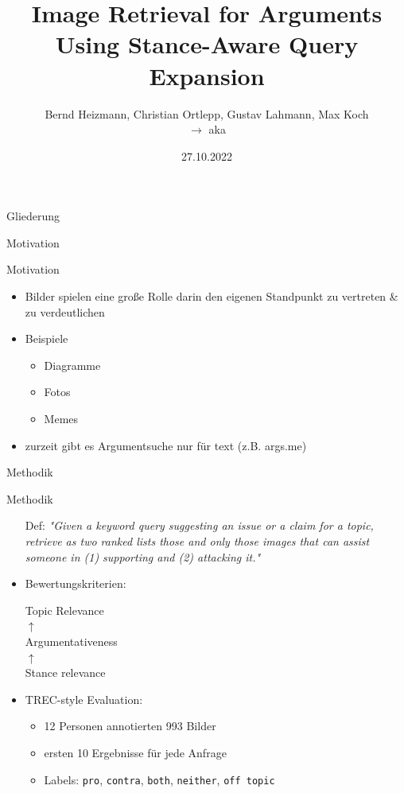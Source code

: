 \documentclass[usenames,dvipsnames]{beamer}
\title{Image Retrieval for Arguments Using Stance-Aware Query Expansion \texorpdfstring{\supercite{kiesel:2021e}}{}}
\author{Bernd Heizmann, Christian Ortlepp, Gustav Lahmann, Max Koch\texorpdfstring{\\$\longrightarrow$ aka \teamname}{aka \teamname}}
\institute{Friedrich-Schiller-Universität Jena}
\date{27.10.2022}
\begin{document}
	
	
	\maketitle

	\begin{frame}{Gliederung}
		\tableofcontents
	\end{frame}
	
	\begin{section}{Motivation}
		\begin{frame}{Motivation}
			\begin{itemize}
				\item Bilder spielen eine große Rolle darin den eigenen Standpunkt zu vertreten \& zu verdeutlichen
				\item Beispiele \begin{itemize}
					\item Diagramme
					\item Fotos
					\item Memes
				\end{itemize}
			\item zurzeit gibt es Argumentsuche nur für text (z.B. args.me)
			\end{itemize}
		\end{frame}
	\end{section}
	
	\begin{section}{Methodik}
		\begin{frame}{Methodik}
			\begin{itemize}
				\item[Def:] \textit{"Given a keyword query suggesting an issue or a claim for a topic, retrieve as two ranked lists those and only those images that can assist someone in (1) supporting and (2) attacking it."}
				\item Bewertungskriterien:
					\begin{minipage}[t]{0.5\textwidth}
						\centering
							Topic Relevance \\
							$\uparrow$ \\
							Argumentativeness \\
							$\uparrow$ \\
							Stance relevance
						\end{minipage}
				\item TREC-style Evaluation:
					\begin{itemize}
						\item 12 Personen annotierten 993 Bilder
						\item ersten 10 Ergebnisse für jede Anfrage
						\item Labels: \texttt{pro}, \texttt{contra}, \texttt{both}, \texttt{neither}, \texttt{off topic}
					\end{itemize}
			\end{itemize}
		\end{frame}
	
	\end{section}
\end{document}
